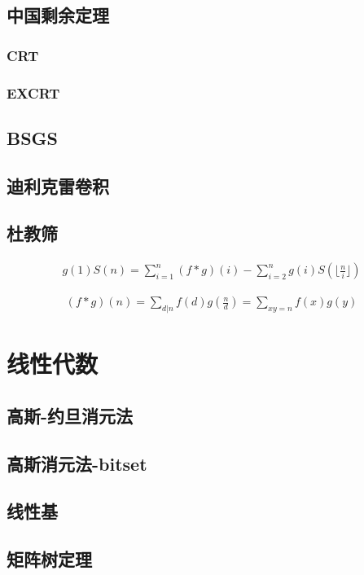 \documentclass{article}
\begin{document}
\subsection{中国剩余定理}
\subsubsection{CRT}

\subsubsection{EXCRT}

\subsection{BSGS}
\subsection{迪利克雷卷积}
\subsection{杜教筛}

$$
\begin{aligned}
g(1)S(n)=\sum_{i=1}^n(f*g)(i)-\sum_{i=2}^ng(i)S(\lfloor\frac{n}{i}\rfloor)
\end{aligned}
$$

$$
\begin{aligned}
(f*g)(n)=\underset{d|n}{\sum} f(d)g(\frac{n}{d})=\underset{xy=n}{\sum} f(x)g(y)
\end{aligned}
$$

\section{线性代数}
\subsection{高斯-约旦消元法}

\subsection{高斯消元法-bitset}

\subsection{线性基}

\subsection{矩阵树定理}

\end{document}
